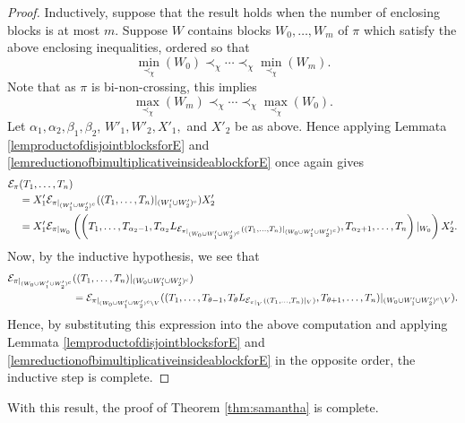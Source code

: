 \begin{proof}
			Inductively, suppose that the result holds when the number of enclosing blocks is at most $m$.
			Suppose $W$ contains blocks $W_0, \ldots, W_m$ of $\pi$ which satisfy the above enclosing inequalities, ordered so that
			\[
				\min_{\prec_\chi}(W_0) \prec_\chi \cdots \prec_\chi \min_{\prec_\chi}(W_m).
			\]
			Note that as $\pi$ is bi-non-crossing, this implies
			\[
				\max_{\prec_\chi}(W_m) \prec_\chi \cdots \prec_\chi \max_{\prec_\chi}(W_0).
			\]
			Let $\alpha_1, \alpha_2, \beta_1, \beta_2$, $W'_1, W'_2, X'_1,$ and $X'_2$ be as above.
			Hence applying Lemmata \ref{lemproductofdisjointblocksforE} and \ref{lemreductionofbimultiplicativeinsideablockforE} once again gives
			\begin{align*}
				\mathcal{E}_\pi&(T_1,\ldots, T_n) \\
				&= X'_1\mathcal{E}_{\pi|_{(W'_1 \cup W'_2)^c}}((T_1,\ldots, T_n)|_{(W'_1 \cup W'_2)^c})X'_2\\
				&= X'_1\mathcal{E}_{\pi|_{W_0 }}\left(\left(T_1,\ldots, T_{\alpha_2 - 1}, T_{\alpha_2}L_{\mathcal{E}_{\pi|_{(W_0 \cup W'_1 \cup W'_2)^c}}((T_1, \ldots, T_n)|_ {(W_0 \cup W'_1 \cup W'_2)^c})}, T_{\alpha_2+1},\ldots, T_n\right)|_{W_0}\right)X'_2.
			\end{align*}
			Now, by the inductive hypothesis, we see that
			\begin{align*}
				\mathcal{E}_{\pi|_{(W_0 \cup W'_1 \cup W'_2)^c}}&((T_1, \ldots, T_n)|_ {(W_0 \cup W'_1 \cup W'_2)^c}) \\
				&
				= \mathcal{E}_{\pi|_{(W_0 \cup W'_1 \cup W'_2)^c \setminus V}}((T_1, \ldots, T_{\theta - 1}, T_\theta L_{\mathcal{E}_{\pi|_V}((T_1,\ldots, T_n)|_{V})}, T_{\theta + 1}, \ldots, T_n)|_ {(W_0 \cup W'_1 \cup W'_2)^c\setminus V}).
			\end{align*}
			Hence, by substituting this expression into the above computation and applying Lemmata \ref{lemproductofdisjointblocksforE} and \ref{lemreductionofbimultiplicativeinsideablockforE} in the opposite order, the inductive step is complete.
		\end{proof}



		With this result, the proof of Theorem \ref{thm:samantha} is complete.
























